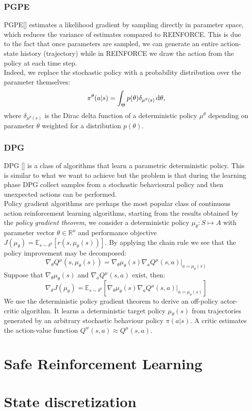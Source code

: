 \subsubsection{PGPE}
\acf{PGPE}[\citet{inproceedings}] estimates a likelihood gradient by sampling directly in parameter space, which reduces the variance of estimates compared to REINFORCE. This is due to the fact that once parameters are sampled, we can generate an entire action-state history (trajectory) while in REINFORCE we draw the action from the policy at each time step.\\
\newline
Indeed, we replace the stochastic policy with a probability distribution over the parameter themselves:
$$ \pi^{\theta}(a|s) = \int_{\Theta} p(\theta) \delta_{\mu^{\theta}(s)}\,\mathrm{d} \theta,
$$
where $\delta_{\mu^{\theta}(s)}$ is the Dirac delta function of a deterministic policy $\mu^{\theta}$ depending on parameter $\theta$ weighted for a distribution $p(\theta)$.


\subsubsection{DPG}
\acf{DPG} [\citet{article}] is a class of algorithms that learn a parametric deterministic policy. This is similar to what we want to achieve but the problem is that during the learning phase \ac{DPG} collect samples from a stochastic behavioural policy and then unexpected actions can be performed.\\
\newline
Policy gradient algorithms are perhaps the most popular class of continuous action reinforcement learning algorithms, starting from the results obtained by the \emph{policy gradient theorem}, we consider a deterministic policy $\mu_{\theta}: S \mapsto A$ with parameter vector $\theta \in \mathbb{R}^n$ and performance objective $J(\mu_{\theta}) = \mathbb{E}_{s \sim \delta^{\mu}}[r(s, \mu_{\theta}(s))]$. 
By applying the chain rule we see that the policy improvement may be decomposed:
$$
\nabla_{\theta} Q^{\mu}(s, \mu_{\theta}(s)) = \nabla_{\theta}\mu_{\theta}(s)\nabla_a Q^{\mu}(s, a)|_{a=\mu_{\theta}(s)}
$$
Suppose that $\nabla_{\theta}\mu_{\theta}(s)$ and $\nabla_aQ^{\mu}(s,a)$ exist, then:
$$
\nabla_{\theta}J(\mu_{\theta}) = \mathbb{E}_{s \sim \delta^{\mu}} [\nabla_{\theta} \mu_{\theta} (s) \nabla_a Q^{\mu}(s,a)|_{a = \mu_{\theta} (s)}]
$$
We use the deterministic policy gradient theorem to derive an off-policy actor-critic algorithm. It learns a deterministic target policy $\mu_{\theta}(s)$ from trajectories generated by an arbitrary stochastic behaviour policy $\pi(a|s)$. A critic estimates the action-value function $Q^w(s,a) \approx Q^{\mu}(s,a)$. 

\section{Safe Reinforcement Learning}

\section{State discretization}